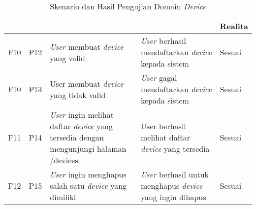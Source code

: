 \bgroup
\begin{table}[ht]
  \def\arraystretch{1.3}
  \caption{Skenario dan Hasil Pengujian Domain \textit{Device}}
  \label{tab:pengujian-domain-device}
  \centering
  \begin{tabular}{|p{2cm}|p{2cm}|p{3cm}|p{3cm}|p{1.5cm}|}
    \hline
    \centering{ID Fungsional} & \centering{ID Pengujian} & \centering{Skenario}                                                                                 & \centering{Ekspektasi}                                                    & Realita \\
    \hline
    F10                       & P12                      & \textit{User} membuat \textit{device} yang valid                                                     & \textit{User} berhasil mendaftarkan \textit{device} kepada sistem         & Sesuai  \\
    \hline
    F10                       & P13                      & {User} membuat \textit{device} yang tidak valid                                                      & \textit{User} gagal mendaftarkan \textit{device} kepada sistem            & Sesuai  \\
    \hline
    F11                       & P14                      & \textit{User} ingin melihat daftar \textit{device} yang tersedia dengan mengunjungi halaman /devices & User berhasil melihat daftar \textit{device} yang tersedia                & Sesuai  \\
    \hline
    F12                       & P15                      & \textit{User} ingin menghapus salah satu \textit{device} yang dimiliki                               & \textit{User} berhasil untuk menghapus \textit{device} yang ingin dihapus & Sesuai  \\
    \hline
  \end{tabular}
\end{table}
\egroup


